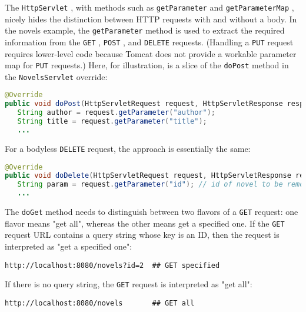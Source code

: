 \documentclass[12pt]{article}
\begin{document}
The \verb|HttpServlet| , with methods such as \verb|getParameter| and \verb|getParameterMap| , nicely hides the distinction between HTTP requests with and without a body. In the novels example, the \verb|getParameter| method is used to extract the required information from the \verb|GET| , \verb|POST| , and \verb|DELETE| requests. (Handling a \verb|PUT| request requires lower-level code because Tomcat does not provide a workable parameter map for \verb|PUT| requests.) Here, for illustration, is a slice of the \verb|doPost| method in the \verb|NovelsServlet| override:\\

\begin{lstlisting}[language=java]
@Override
public void doPost(HttpServletRequest request, HttpServletResponse response) {
   String author = request.getParameter("author");
   String title = request.getParameter("title");
   ...

\end{lstlisting}

For a bodyless \verb|DELETE| request, the approach is essentially the same:\\

\begin{lstlisting}[language=java]
@Override
public void doDelete(HttpServletRequest request, HttpServletResponse response) {
   String param = request.getParameter("id"); // id of novel to be removed
   ...

\end{lstlisting}

The \verb|doGet| method needs to distinguish between two flavors of a \verb|GET| request: one flavor means "get all", whereas the other means get a specified one. If the \verb|GET| request URL contains a query string whose key is an ID, then the request is interpreted as "get a specified one":\\

\begin{lstlisting}
http://localhost:8080/novels?id=2  ## GET specified

\end{lstlisting}

If there is no query string, the \verb|GET| request is interpreted as "get all":\\

\begin{lstlisting}
http://localhost:8080/novels       ## GET all

\end{lstlisting}
\end{document}
